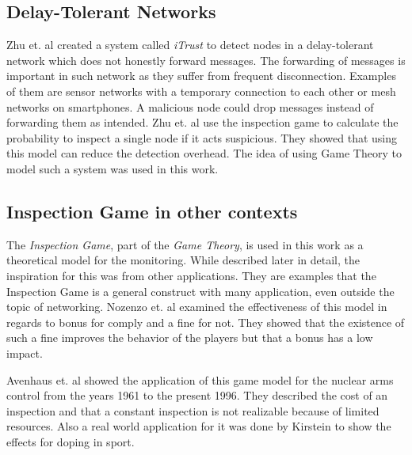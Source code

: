 \documentclass[thesis.tex]{subfiles}
\begin{document}
\subsection{Delay-Tolerant Networks}
Zhu et. al \cite{Zhu.2014} created a system called \textit{iTrust} to detect nodes in a delay-tolerant network which does not honestly forward messages. The forwarding of messages is important in such network as they suffer from frequent disconnection. Examples of them are sensor networks with a temporary connection to each other or mesh networks on smartphones. A malicious node could drop messages instead of forwarding them as intended. Zhu et. al use the inspection game to calculate the probability to inspect a single node if it acts suspicious. They showed that using this model can reduce the detection overhead. The idea of using Game Theory to model such a system was used in this work.

\subsection{Inspection Game in other contexts}
The \textit{Inspection Game}, part of the \textit{Game Theory}, is used in this work as a theoretical model for the monitoring. While described later in detail, the inspiration for this was from other applications. They are examples that the Inspection Game is a general construct with many application, even outside the topic of networking. Nozenzo et. al \cite{Nosenzo.2014} examined the effectiveness of this model in regards to bonus for comply and a fine for not. They showed that the existence of such a fine improves the behavior of the players but that a bonus has a low impact. 

Avenhaus et. al \cite{Avenhaus.1996} showed the application of this game model for the nuclear arms control from the years 1961 to the present 1996. They described the cost of an inspection and that a constant inspection is not realizable because of limited resources. Also a real world application for it was done by Kirstein \cite{RolandKirstein.2009} to show the effects for doping in sport.

\subfilebib %
\end{document}
